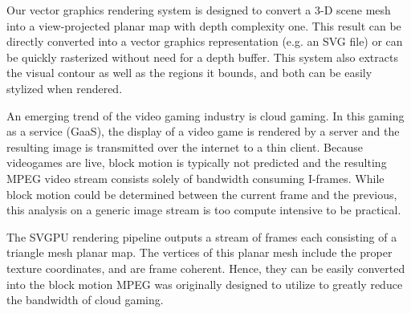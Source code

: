 \documentclass[review]{acmsiggraph}
\begin{document}
Our vector graphics rendering system is designed to convert a 3-D scene mesh
into a view-projected planar map with depth complexity one. This result can be
directly converted into a vector graphics representation (e.g. an SVG file) or
can be quickly rasterized without need for a depth buffer. This system also
extracts the visual contour as well as the regions it bounds, and both can be
easily stylized when rendered.

An emerging trend of the video gaming industry is cloud gaming. In this gaming
as a service (GaaS), the display of a video game is rendered by a server and
the resulting image is transmitted over the internet to a thin client. Because
videogames are live, block motion is typically not predicted and the resulting
MPEG video stream consists solely of bandwidth consuming I-frames. While block
motion could be determined between the current frame and the previous, this
analysis on a generic image stream is too compute intensive to be practical.

The SVGPU rendering pipeline outputs a stream of frames each consisting of a
triangle mesh planar map. The vertices of this planar mesh include the proper
texture coordinates, and are frame coherent. Hence, they can be easily
converted into the block motion MPEG was originally designed to utilize to
greatly reduce the bandwidth of cloud gaming.
\end{document}
